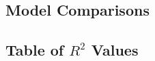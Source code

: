 \documentclass[11pt]{article}
\begin{document}
\subsection{Model Comparisons}


\subsection{Table of $R^2$ Values}
\end{document}
